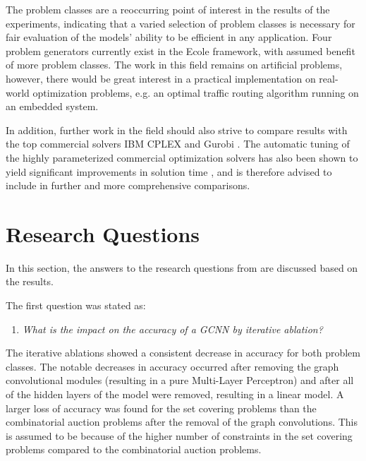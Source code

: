 The problem classes are a reoccurring point of interest in the results of the experiments, indicating that a varied selection of problem classes is necessary for fair evaluation of the models' ability to be efficient in any application. Four problem generators currently exist in the \gls{Ecole} framework, with assumed benefit of more problem classes. 
The work in this field remains on artificial problems, however, there would be great interest in a practical implementation on real-world optimization problems, e.g. an optimal traffic routing algorithm running on an embedded system. 

In addition, further work in the field should also strive to compare results with the top commercial solvers IBM CPLEX and Gurobi \cite{anand2017comparative}. The automatic tuning of the highly parameterized commercial optimization solvers has also been shown to yield significant improvements in solution time \cite{hutter2010automated}, and is therefore advised to include in further and more comprehensive comparisons.   





\section{Research Questions}\label{sec:dis_questions}

In this section, the answers to the research questions from  are discussed based on the results. 

The first question was stated as:
%
\begin{enumerate}[label=(\roman*)]
    \item \textit{What is the impact on the accuracy of a \gls{GCNN} by iterative ablation?}
\end{enumerate}
%
The iterative ablations showed a consistent decrease in accuracy for both problem classes. The notable decreases in accuracy occurred after removing the graph convolutional modules (resulting in a pure Multi-Layer Perceptron) and after all of the hidden layers of the model were removed, resulting in a linear model. A larger loss of accuracy was found for the set covering problems than the combinatorial auction problems after the removal of the graph convolutions.
This is assumed to be because of the higher number of constraints in the set covering problems compared to the combinatorial auction problems. 

